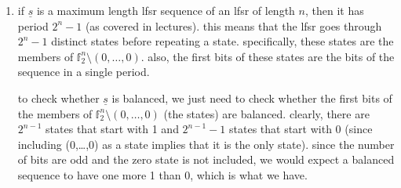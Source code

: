 \usepackage{amsfonts}

\begin{enumerate}

\item if $\underline{s}$ is a maximum length lfsr sequence of an lfsr of length
$n$, then it has period $2^n-1$ (as covered in lectures). this means that the
lfsr goes through $2^n-1$ distinct states before repeating a state.
specifically, these states are the members of $\mathbb{f}_2^n \setminus
(0,\dots,0)$. also, the first bits of these states are the bits of the sequence
in a single period.

to check whether $\underline{s}$ is balanced, we just need to check whether the
first bits of the members of $\mathbb{f}_2^n \setminus (0,\dots,0)$ (the states)
are balanced. clearly, there are $2^{n-1}$ states that start with 1 and
$2^{n-1}-1$ states that start with 0 (since including (0,\dots,0) as a state
implies that it is the only state). since the number of bits are odd and the
zero state is not included, we would expect a balanced sequence to have one more
1 than 0, which is what we have.

\end{enumerate}
